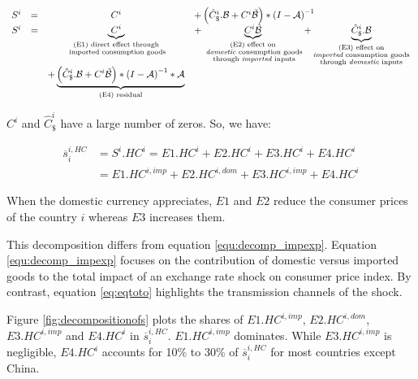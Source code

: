 \documentclass[11pt,a4paper]{article}
\begin{document}
\begin{equation}
\begin{array}{lccl}
	S^ i&=&C^i	&+ \left(\hat{C}^i_\$.{\cal B}+{C^i}{\tilde{{\cal B}}}\right)*{{(I-{\cal A})}^{-1}} \\
	S^i &=&\underbrace{C^i}_{\substack{\text{(E1) direct effect through} \\ \text{ imported consumption goods}}}&+ \underbrace{{C^i}{\tilde{{\cal B}}}}_{\substack{\text{(E2) effect on} \\ \text{ \emph{domestic} consumption goods} \\ \text{ through \emph{imported} inputs}}}  + \underbrace{\hat{C}^i_\$.{\cal B}}_{\substack{\text{(E3)  effect on} \\ \text{\emph{imported} consumption goods} \\ \text{through \emph{domestic} inputs}}} \\ &&+\underbrace {\left( \hat{C}^i_\$.{\cal B} + {C^i}{\tilde{{\cal B}}}\right)*{{(I-{\cal A})}^{-1}}*{\cal A}}_{\text{(E4) residual}} \\
\end{array}
\end{equation}


$C^i$ and $\hat{C}^i_\$$ have a large number of zeros. So, we have:

\begin{equation}
\begin{array}{lccl}
\overline{s}_{i}^{i,HC}&=S^i.HC^i=E1.HC^i+E2.HC^i+E3.HC^i+E4.HC^i \\
&=E1.HC^{i,imp}+E2.HC^{i,dom}+E3.HC^{i,imp}+E4.HC^i
 \end{array} 
 \label{eq:eqtoto}
 \end{equation}
 
When the domestic currency appreciates, $E1$ and $E2$ reduce the consumer prices of the country $i$ whereas $E3$ increases them. 

 
This decomposition differs from equation \ref{equ:decomp_impexp}. 
Equation \ref{equ:decomp_impexp} focuses on the contribution of domestic versus imported goods to the total impact of an exchange rate shock on consumer price index. 
By contrast, equation \ref{eq:eqtoto} highlights the transmission channels of the shock.


Figure \ref{fig:decompositionofs} plots the shares of $E1.HC^{i,imp}$, $E2.HC^{i,dom}$, $E3.HC^{i,imp}$ and $E4.HC^i$ in $\overline{s}_{i}^{i,HC}$.  
$E1.HC^{i,imp}$ dominates. 
While $E3.HC^{i,imp}$ is negligible, $E4.HC^i$ accounts for 10\% to 30\% of $\overline{s}_{i}^{i,HC}$ for most countries except China.
\end{document}
